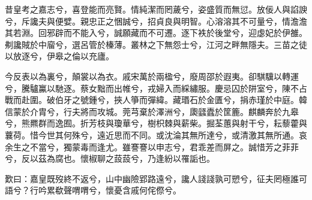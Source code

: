 
\begin{pinyinscope}
昔皇考之嘉志兮，喜登能而亮賢。情純潔而罔薉兮，姿盛質而無愆。放佞人與諂諛兮，斥讒夫與便嬖。親忠正之悃誠兮，招貞良與明智。心溶溶其不可量兮，情澹澹其若淵。回邪辟而不能入兮，誠願藏而不可遷。逐下袟於後堂兮，迎虙妃於伊雒。刜讒賊於中廇兮，選呂管於榛薄。叢林之下無怨士兮，江河之畔無隱夫。三苗之徒以放逐兮，伊皋之倫以充廬。

今反表以為裏兮，顛裳以為衣。戚宋萬於兩楹兮，廢周邵於遐夷。卻騏驥以轉運兮，騰驢鸁以馳逐。蔡女黜而出帷兮，戎婦入而綵繡服。慶忌囚於阱室兮，陳不占戰而赴圍。破伯牙之號鍾兮，挾人箏而彈緯。藏瑉石於金匱兮，捐赤瑾於中庭。韓信蒙於介胄兮，行夫將而攻城。莞芎棄於澤洲兮，瓟瓥蠹於筐簏。麒麟奔於九皋兮，熊羆群而逸囿。折芳枝與瓊華兮，樹枳棘與薪柴。掘荃蕙與射干兮，耘藜藿與蘘荷。惜今世其何殊兮，遠近思而不同。或沈淪其無所達兮，或清激其無所通。哀余生之不當兮，獨蒙毒而逢尤。雖謇謇以申志兮，君乖差而屏之。誠惜芳之菲菲兮，反以茲為腐也。懷椒聊之蔎蔎兮，乃逢紛以罹詬也。

歎曰：嘉皇既歿終不返兮，山中幽險郢路遠兮，讒人諓諓孰可愬兮，征夫罔極誰可語兮？行吟累欷聲喟喟兮，懷憂含戚何侘傺兮。


\end{pinyinscope}